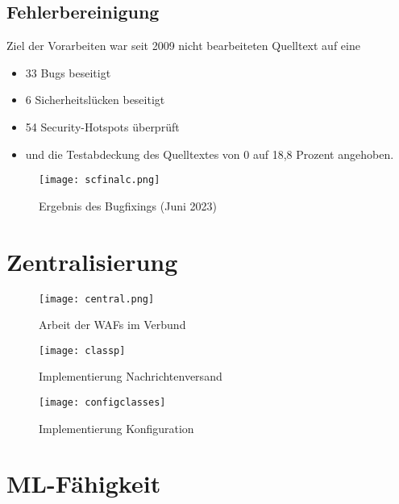 \subsection{Fehlerbereinigung}

Ziel der Vorarbeiten war seit 2009 nicht bearbeiteten Quelltext auf eine

\begin{itemize}
    \item 33 Bugs beseitigt
    \item 6 Sicherheitslücken beseitigt
    \item 54 Security-Hotspots überprüft
    \item und die Testabdeckung des Quelltextes von 0 auf 18,8 Prozent angehoben.
\end{itemize}

\begin{figure}
    \centering
    \texttt{[image: scfinalc.png]}
    \caption{Ergebnis des Bugfixings (Juni 2023)}
    \label{fig:my_sonarf}
\end{figure}


\section{Zentralisierung}
\begin{figure}[ht]
    \centering
    \texttt{[image: central.png]}
    \caption{Arbeit der WAFs im Verbund}
    \label{fig:my_verbund}
\end{figure}

\begin{figure}[bht]
  \begin{center}
    \texttt{[image: classp]}
    \caption{Implementierung Nachrichtenversand}
    \label{fig.impversand}
  \end{center}
\end{figure}

\begin{figure}[h]
  \begin{center}
    \texttt{[image: configclasses]}
    \caption{Implementierung Konfiguration}
    \label{fig.impkonfig}
  \end{center}
\end{figure}



\section{ML-Fähigkeit}

